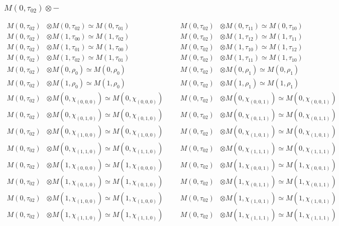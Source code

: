 \subsubsection{$ M(0,\tau_{02})\otimes -$}
\begin{align*}
M(0,\tau_{02}) &\otimes M(0,\tau_{02}) \simeq M(0,\tau_{01}) &&& M(0,\tau_{02}) &\otimes M(0,\tau_{11}) \simeq M(0,\tau_{10})\\
M(0,\tau_{02}) &\otimes M(1,\tau_{00}) \simeq M(1,\tau_{02}) &&& M(0,\tau_{02}) &\otimes M(1,\tau_{12}) \simeq M(1,\tau_{11})\\
M(0,\tau_{02}) &\otimes M(1,\tau_{01}) \simeq M(1,\tau_{00}) &&& M(0,\tau_{02}) &\otimes M(1,\tau_{10}) \simeq M(1,\tau_{12})\\
M(0,\tau_{02}) &\otimes M(1,\tau_{02}) \simeq M(1,\tau_{01}) &&& M(0,\tau_{02}) &\otimes M(1,\tau_{11}) \simeq M(1,\tau_{10})\\
M(0,\tau_{02}) &\otimes M(0,\rho_{0}) \simeq M(0,\rho_{0}) &&& M(0,\tau_{02}) &\otimes M(0,\rho_{1}) \simeq M(0,\rho_{1})\\
M(0,\tau_{02}) &\otimes M(1,\rho_{0}) \simeq M(1,\rho_{0}) &&& M(0,\tau_{02}) &\otimes M(1,\rho_{1}) \simeq M(1,\rho_{1})\\
M(0,\tau_{02}) &\otimes M(0,\chi_{(0,0,0)}) \simeq M(0,\chi_{(0,0,0)}) &&& M(0,\tau_{02}) &\otimes M(0,\chi_{(0,0,1)}) \simeq M(0,\chi_{(0,0,1)})\\
M(0,\tau_{02}) &\otimes M(0,\chi_{(0,1,0)}) \simeq M(0,\chi_{(0,1,0)}) &&& M(0,\tau_{02}) &\otimes M(0,\chi_{(0,1,1)}) \simeq M(0,\chi_{(0,1,1)})\\
M(0,\tau_{02}) &\otimes M(0,\chi_{(1,0,0)}) \simeq M(0,\chi_{(1,0,0)}) &&& M(0,\tau_{02}) &\otimes M(0,\chi_{(1,0,1)}) \simeq M(0,\chi_{(1,0,1)})\\
M(0,\tau_{02}) &\otimes M(0,\chi_{(1,1,0)}) \simeq M(0,\chi_{(1,1,0)}) &&& M(0,\tau_{02}) &\otimes M(0,\chi_{(1,1,1)}) \simeq M(0,\chi_{(1,1,1)})\\
M(0,\tau_{02}) &\otimes M(1,\chi_{(0,0,0)}) \simeq M(1,\chi_{(0,0,0)}) &&& M(0,\tau_{02}) &\otimes M(1,\chi_{(0,0,1)}) \simeq M(1,\chi_{(0,0,1)})\\
M(0,\tau_{02}) &\otimes M(1,\chi_{(0,1,0)}) \simeq M(1,\chi_{(0,1,0)}) &&& M(0,\tau_{02}) &\otimes M(1,\chi_{(0,1,1)}) \simeq M(1,\chi_{(0,1,1)})\\
M(0,\tau_{02}) &\otimes M(1,\chi_{(1,0,0)}) \simeq M(1,\chi_{(1,0,0)}) &&& M(0,\tau_{02}) &\otimes M(1,\chi_{(1,0,1)}) \simeq M(1,\chi_{(1,0,1)})\\
M(0,\tau_{02}) &\otimes M(1,\chi_{(1,1,0)}) \simeq M(1,\chi_{(1,1,0)}) &&& M(0,\tau_{02}) &\otimes M(1,\chi_{(1,1,1)}) \simeq M(1,\chi_{(1,1,1)})\\

\end{align*}
